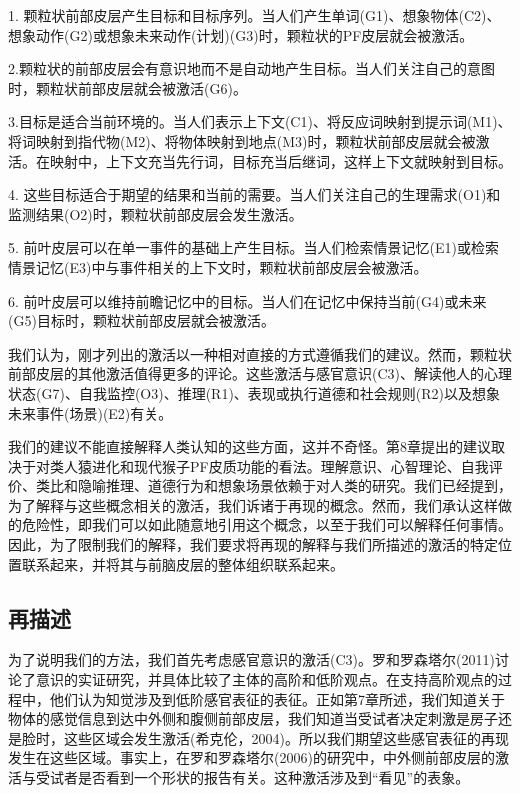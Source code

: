 1. 颗粒状前部皮层产生目标和目标序列。当人们产生单词(G1)、想象物体(C2)、想象动作(G2)或想象未来动作(计划)(G3)时，颗粒状的PF皮层就会被激活。

2.颗粒状的前部皮层会有意识地而不是自动地产生目标。当人们关注自己的意图时，颗粒状前部皮层就会被激活(G6)。

3.目标是适合当前环境的。当人们表示上下文(C1)、将反应词映射到提示词(M1)、将词映射到指代物(M2)、将物体映射到地点(M3)时，颗粒状前部皮层就会被激活。在映射中，上下文充当先行词，目标充当后继词，这样上下文就映射到目标。

4. 这些目标适合于期望的结果和当前的需要。当人们关注自己的生理需求(O1)和监测结果(O2)时，颗粒状前部皮层会发生激活。

5. 前叶皮层可以在单一事件的基础上产生目标。当人们检索情景记忆(E1)或检索情景记忆(E3)中与事件相关的上下文时，颗粒状前部皮层会被激活。

6. 前叶皮层可以维持前瞻记忆中的目标。当人们在记忆中保持当前(G4)或未来(G5)目标时，颗粒状前部皮层就会被激活。

我们认为，刚才列出的激活以一种相对直接的方式遵循我们的建议。然而，颗粒状前部皮层的其他激活值得更多的评论。这些激活与感官意识(C3)、解读他人的心理状态(G7)、自我监控(O3)、推理(R1)、表现或执行道德和社会规则(R2)以及想象未来事件(场景)(E2)有关。

我们的建议不能直接解释人类认知的这些方面，这并不奇怪。第8章提出的建议取决于对类人猿进化和现代猴子PF皮质功能的看法。理解意识、心智理论、自我评价、类比和隐喻推理、道德行为和想象场景依赖于对人类的研究。我们已经提到，为了解释与这些概念相关的激活，我们诉诸于再现的概念。然而，我们承认这样做的危险性，即我们可以如此随意地引用这个概念，以至于我们可以解释任何事情。因此，为了限制我们的解释，我们要求将再现的解释与我们所描述的激活的特定位置联系起来，并将其与前脑皮层的整体组织联系起来。

\subsection{再描述}

为了说明我们的方法，我们首先考虑感官意识的激活(C3)。罗和罗森塔尔(2011)讨论了意识的实证研究，并具体比较了主体的高阶和低阶观点。在支持高阶观点的过程中，他们认为知觉涉及到低阶感官表征的表征。正如第7章所述，我们知道关于物体的感觉信息到达中外侧和腹侧前部皮层，我们知道当受试者决定刺激是房子还是脸时，这些区域会发生激活(希克伦，2004)。所以我们期望这些感官表征的再现发生在这些区域。事实上，在罗和罗森塔尔(2006)的研究中，中外侧前部皮层的激活与受试者是否看到一个形状的报告有关。这种激活涉及到“看见”的表象。

